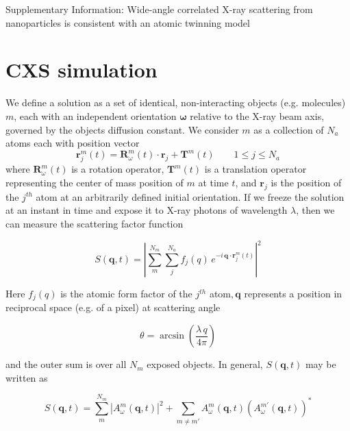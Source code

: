 \documentclass [12pt,fleqn]{article}
\def \be {\begin{equation}}
\def \ee {\end{equation}}
\begin{document}
\newpage


\large{Supplementary Information: Wide-angle correlated X-ray scattering from nanoparticles is consistent with an atomic twinning model}

\setcounter{equation}{0}
\setcounter{figure}{0}
\setcounter{table}{0}
\setcounter{section}{0}
\setcounter{page}{1}
\makeatletter
\renewcommand{\theequation}{S\arabic{equation}}
\renewcommand{\thefigure}{S\arabic{figure}}
\renewcommand{\thesection}{S\arabic{section}}

\section{CXS simulation} \label{supp:sim}
We define a solution as a set of identical, non-interacting objects (e.g. molecules) $m$, each with an independent orientation $\bm \omega$ relative to the X-ray beam axis, governed by the objects diffusion constant. We consider $m$ as a collection of $N_a$ atoms each with position vector 
\be
\bm r^m_j (t) = \bm R^m_\omega (t)\cdot \bm r_j + \bm T^m(t) \qquad 1 \le j \le N_a
\ee 
where $\bm R^m_\omega(t)$ is a rotation operator, $\bm T^m (t)$ is a translation operator representing the center of mass position of $m$ at time $t$, and $\bm r_j$ is the position of the $j^{th}$ atom at an arbitrarily defined initial orientation. If we freeze the solution at an instant in time and expose it to X-ray photons of wavelength $\lambda$, then we can measure the scattering factor function

\be
S(\bm q, t) = \left | \sum_m^{N_m} \sum_{j}^{N_a} f_j(q) \,e ^ { -i \,\bm q \cdot \bm  r^m _j (t)  } \right |^2
\ee

Here $f_j(q)$ is the atomic form factor of the $j^{th}$ atom$, \bm q$ represents a position in reciprocal space (e.g. of a pixel) at scattering angle  

\be \label{angle}
\theta= \arcsin \left( \frac{ \lambda \,q}{ 4 \pi} \right )
\ee

and the outer sum is over all $N_m$ exposed objects. In general, $S(\bm q, t)$ may be written as

\be \label{ sums }
S( \bm q, t) = \sum_m^{N_m} \left | A^m_\omega (\bm q ,t ) \right|^2 + \sum _{ m \neq m' } A^m_\omega (\bm q,t ) \left (A^{m'}_\omega (\bm q,t ) \right )^*
\ee
\end{document}
